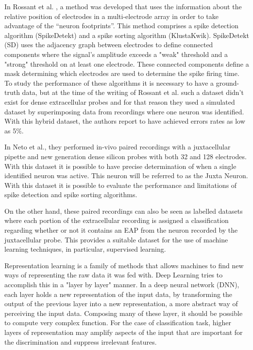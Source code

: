 \documentclass[10pt]{article}
\begin{document}
In Rossant et al. \cite{Rossant2016}, a method was developed that uses the information about the relative position of electrodes in a multi-electrode array in order to take advantage of the “neuron footprints”. This method comprises a spike detection algorithm (SpikeDetekt) and a spike sorting algorithm (KlustaKwik). SpikeDetekt (SD) uses the adjacency graph between electrodes to define connected components where the signal's amplitude exceeds a "weak" threshold and a "strong" threshold on at least one electrode. These connected components define a mask determining which electrodes are used to determine the spike firing time. To study the performance of these algorithms it is necessary to have a ground-truth data, but at the time of the writing of Rossant et al. such a dataset didn't exist for dense extracellular probes and for that reason they used a simulated dataset by superimposing data from recordings where one neuron was identified. With this hybrid dataset, the authors report to have achieved errors rates as low as 5\%.

In Neto et al., they performed in-vivo paired recordings with a juxtacellular pipette and new generation dense silicon probes with both 32 and 128 electrodes. With this dataset it is possible to have precise determination of when a single identified neuron was active. This neuron will be referred to as the Juxta Neuron. With this dataset it is possible to evaluate the performance and limitations of spike detection and spike sorting algorithms.

On the other hand, these paired recordings can also be seen as labelled datasets where each portion of the extracellular recording is assigned a classification regarding whether or not it contains an EAP from the neuron recorded by the juxtacellular probe. This provides a suitable dataset for the use of machine learning techniques, in particular, supervised learning.

Representation learning is a family of methods that allows machines to find new ways of representing the raw data it was fed with. Deep Learning tries to accomplish this in a "layer by layer" manner. In a deep neural network (DNN), each layer holds a new representation of the input data, by transforming the output of the previous layer into a new representation, a more abstract way of perceiving the input data. Composing many of these layer, it should be possible to compute very complex function. For the case of classification task, higher layers of representation may amplify aspects of the input that are important for the discrimination and suppress irrelevant features. \cite{lecun2015deep}
\end{document}
